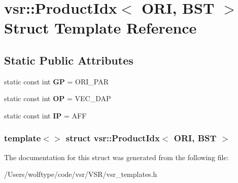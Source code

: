 \hypertarget{structvsr_1_1_product_idx_3_01_o_r_i_00_01_b_s_t_01_4}{\section{vsr\-:\-:Product\-Idx$<$ O\-R\-I, B\-S\-T $>$ Struct Template Reference}
\label{structvsr_1_1_product_idx_3_01_o_r_i_00_01_b_s_t_01_4}
}
\subsection*{Static Public Attributes}
\begin{DoxyCompactItemize}
\item 
\hypertarget{structvsr_1_1_product_idx_3_01_o_r_i_00_01_b_s_t_01_4_aa5ccf0c18a74d6a956426d54a46d4634}{static const int {\bfseries G\-P} = O\-R\-I\-\_\-\-P\-A\-R}\label{structvsr_1_1_product_idx_3_01_o_r_i_00_01_b_s_t_01_4_aa5ccf0c18a74d6a956426d54a46d4634}

\item 
\hypertarget{structvsr_1_1_product_idx_3_01_o_r_i_00_01_b_s_t_01_4_a41f9eb93b135622044bffb4347ea4cf3}{static const int {\bfseries O\-P} = V\-E\-C\-\_\-\-D\-A\-P}\label{structvsr_1_1_product_idx_3_01_o_r_i_00_01_b_s_t_01_4_a41f9eb93b135622044bffb4347ea4cf3}

\item 
\hypertarget{structvsr_1_1_product_idx_3_01_o_r_i_00_01_b_s_t_01_4_ac6f688b701b909277bd69397aa2f4c5c}{static const int {\bfseries I\-P} = A\-F\-F}\label{structvsr_1_1_product_idx_3_01_o_r_i_00_01_b_s_t_01_4_ac6f688b701b909277bd69397aa2f4c5c}

\end{DoxyCompactItemize}
\subsubsection*{template$<$$>$ struct vsr\-::\-Product\-Idx$<$ O\-R\-I, B\-S\-T $>$}



The documentation for this struct was generated from the following file\-:\begin{DoxyCompactItemize}
\item 
/\-Users/wolftype/code/vsr/\-V\-S\-R/vsr\-\_\-templates.\-h\end{DoxyCompactItemize}
